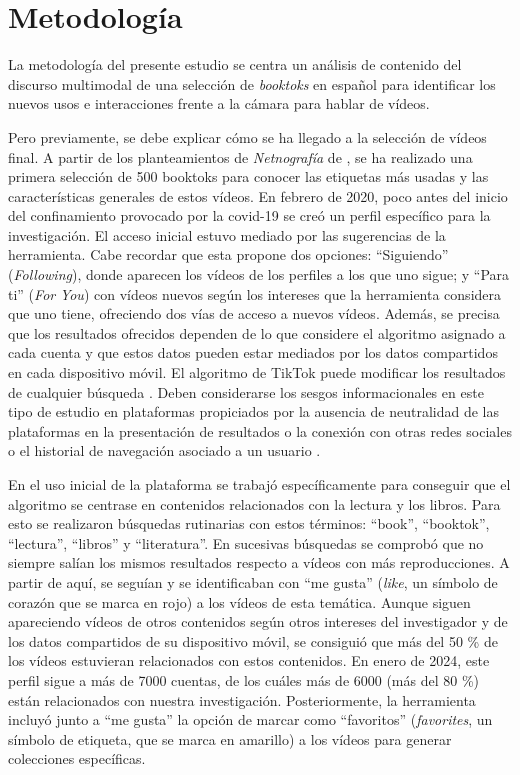 \section{Metodología}\label{sec-metología}

La metodología del presente estudio se centra un análisis de contenido
del discurso multimodal \cite{jewitt2017,norris2019} de una selección de
\emph{booktoks} en español para identificar los nuevos usos e
interacciones frente a la cámara para hablar de vídeos.

Pero previamente, se debe explicar cómo se ha llegado a la selección de
vídeos final. A partir de los planteamientos de \emph{Netnografía} de
\textcite{kozinets2021}, se ha realizado una primera selección de 500 booktoks
para conocer las etiquetas más usadas y las características generales de
estos vídeos. En febrero de 2020, poco antes del inicio del
confinamiento provocado por la covid-19 se creó un perfil específico
para la investigación. El acceso inicial estuvo mediado por las
sugerencias de la herramienta. Cabe recordar que esta propone dos
opciones: ``Siguiendo'' (\emph{Following}), donde aparecen los vídeos de
los perfiles a los que uno sigue; y ``Para ti'' (\emph{For} \emph{You})
con vídeos nuevos según los intereses que la herramienta considera que
uno tiene, ofreciendo dos vías de acceso a nuevos vídeos. Además, se
precisa que los resultados ofrecidos dependen de lo que considere el
algoritmo asignado a cada cuenta y que estos datos pueden estar mediados
por los datos compartidos en cada dispositivo móvil. El algoritmo de
TikTok puede modificar los resultados de cualquier búsqueda \cite{siles2022,jones2023}. Deben considerarse
los sesgos informacionales en este tipo de estudio en plataformas
propiciados por la ausencia de neutralidad de las plataformas \cite{vandijck2013,sumpter2018,hepp2020} en la presentación de resultados
o la conexión con otras redes sociales o el historial de navegación
asociado a un usuario \cite{fisher2019,fisher2022}.

En el uso inicial de la plataforma se trabajó específicamente para
conseguir que el algoritmo se centrase en contenidos relacionados con la
lectura y los libros. Para esto se realizaron búsquedas rutinarias con
estos términos: ``book'', ``booktok'', ``lectura'', ``libros'' y
``literatura''. En sucesivas búsquedas se comprobó que no siempre salían
los mismos resultados respecto a vídeos con más reproducciones. A partir
de aquí, se seguían y se identificaban con ``me gusta'' (\emph{like}, un
símbolo de corazón que se marca en rojo) a los vídeos de esta temática.
Aunque siguen apareciendo vídeos de otros contenidos según otros
intereses del investigador y de los datos compartidos de su dispositivo
móvil, se consiguió que más del 50 \% de los vídeos estuvieran
relacionados con estos contenidos. En enero de 2024, este perfil sigue a
más de 7000 cuentas, de los cuáles más de 6000 (más del 80 \%) están
relacionados con nuestra investigación. Posteriormente, la herramienta
incluyó junto a ``me gusta'' la opción de marcar como ``favoritos''
(\emph{favorites}, un símbolo de etiqueta, que se marca en amarillo) a
los vídeos para generar colecciones específicas.

